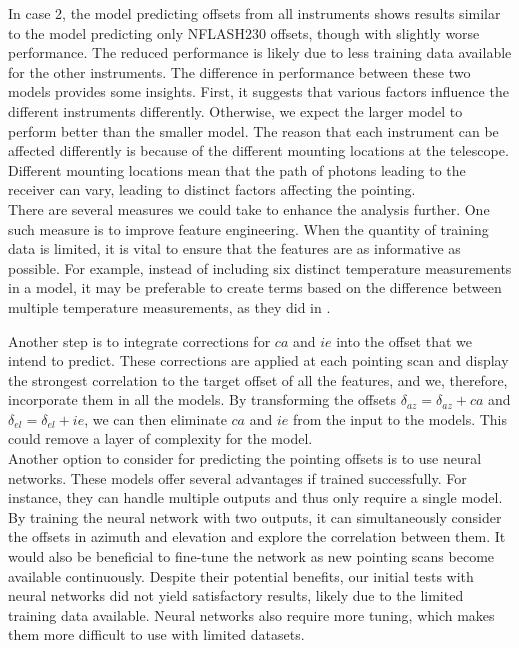 In case 2, the model predicting offsets from all instruments shows results similar to the model predicting only NFLASH230 offsets, though with slightly worse performance.
The reduced performance is likely due to less training data available for the other instruments.
The difference in performance between these two models provides some insights.
First, it suggests that various factors influence the different instruments differently.
Otherwise, we expect the larger model to perform better than the smaller model.
The reason that each instrument can be affected differently is because of the different mounting locations at the telescope.
Different mounting locations mean that the path of photons leading to the receiver can vary, leading to distinct factors affecting the pointing.\\


There are several measures we could take to enhance the analysis further. One such measure is to improve feature engineering.
When the quantity of training data is limited, it is vital to ensure that the features are as informative as possible.
For example, instead of including six distinct temperature measurements in a model,
it may be preferable to create terms based on the difference between multiple temperature measurements, as they did in \cite{whitegreen2022}.

Another step is to integrate corrections for $ca$ and $ie$ into the offset that we intend to predict.
These corrections are applied at each pointing scan and display the strongest correlation to the target offset of all the features,
and we, therefore, incorporate them in all the models.
By transforming the offsets $\delta_{az}=\delta_{az} + ca$ and $\delta_{el}=\delta_{el} + ie$, we can then eliminate $ca$ and $ie$ from the input to the models.
This could remove a layer of complexity for the model.\\


Another option to consider for predicting the pointing offsets is to use neural networks.
These models offer several advantages if trained successfully.
For instance, they can handle multiple outputs and thus only require a single model.
By training the neural network with two outputs, it can simultaneously consider the offsets in azimuth and elevation and explore the correlation between them.
It would also be beneficial to fine-tune the network as new pointing scans become available continuously.
Despite their potential benefits, our initial tests with neural networks did not yield satisfactory results,
likely due to the limited training data available. Neural networks also require more tuning, which makes them more difficult to use with limited datasets.\\


